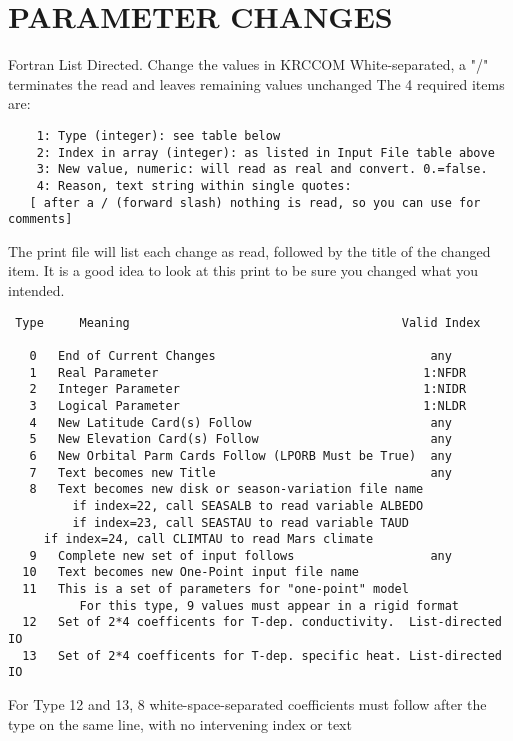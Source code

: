 \documentclass[draft]{article}  %
\begin{document}
\section{PARAMETER CHANGES \label{pc}}

Fortran List Directed.  Change the values in KRCCOM	
White-separated, a "/" terminates the read and leaves remaining values unchanged
The 4 required items are:
\vspace{-3.mm} 
\begin{verbatim}
    1: Type (integer): see table below
    2: Index in array (integer): as listed in Input File table above
    3: New value, numeric: will read as real and convert. 0.=false.
    4: Reason, text string within single quotes:
   [ after a / (forward slash) nothing is read, so you can use for comments]
\end{verbatim}
The print file will list each change as read, followed by the title of the
changed item. It is a good idea to look at this print to be sure you changed
what you intended.
\vspace{-3.mm} 
\begin{verbatim}
 Type     Meaning                                      Valid Index

   0   End of Current Changes                              any
   1   Real Parameter                                     1:NFDR
   2   Integer Parameter                                  1:NIDR
   3   Logical Parameter                                  1:NLDR
   4   New Latitude Card(s) Follow                         any
   5   New Elevation Card(s) Follow                        any
   6   New Orbital Parm Cards Follow (LPORB Must be True)  any
   7   Text becomes new Title                              any
   8   Text becomes new disk or season-variation file name
         if index=22, call SEASALB to read variable ALBEDO
         if index=23, call SEASTAU to read variable TAUD
	 if index=24, call CLIMTAU to read Mars climate
   9   Complete new set of input follows                   any
  10   Text becomes new One-Point input file name
  11   This is a set of parameters for "one-point" model 
          For this type, 9 values must appear in a rigid format
  12   Set of 2*4 coefficents for T-dep. conductivity.  List-directed IO
  13   Set of 2*4 coefficents for T-dep. specific heat. List-directed IO 
\end{verbatim}

For Type 12 and 13, 8 white-space-separated coefficients must follow after 
the type on the same line, with no intervening index or text 
\end{document}
